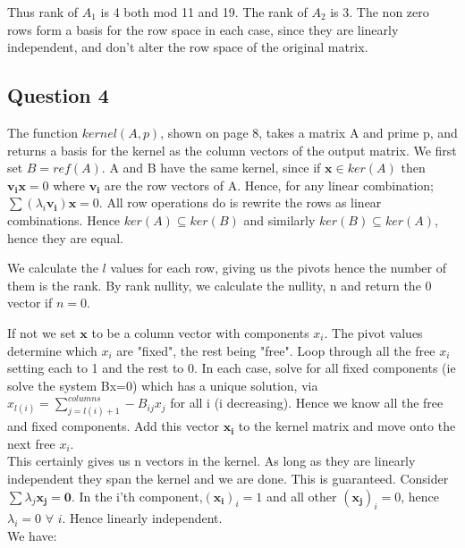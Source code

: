 \documentclass[10pt,a4paper]{report}
\begin{document}
Thus rank of $A_1$ is 4 both mod 11 and 19. The rank of $A_2$ is 3. The non zero rows form a basis for the row space in each case, since they are linearly independent, and don't alter the row space of the original matrix.

\subsection*{Question 4}
  
The function $kernel(A,p)$, shown on page 8, takes a matrix A and prime p, and returns a basis for the kernel as the column vectors of the output matrix. We first set $B=ref(A)$. A and B have the same kernel, since if $\bm{x} \in ker(A)$ then $\bm{v_i}\bm{x}=0$ where $\bm{v_i}$ are the row vectors of A. Hence, for any linear combination; $\sum( \lambda_i \bm{v_i})\bm{x}=0$. All row operations do is rewrite the rows as linear combinations. Hence $ker(A)\subseteq ker(B)$ and similarly $ker(B)\subseteq ker(A)$, hence they are equal.

We calculate the $l$ values for each row, giving us the pivots hence the number of them is the rank. By rank nullity, we calculate the nullity, n and return the 0 vector if $n=0$. 

If not we set $\bm{x}$ to be a column vector with components $x_i$. The pivot values determine which $x_i$ are "fixed", the rest being "free". Loop through all the free $x_i$ setting each to 1 and the rest to 0. In each case, solve for all fixed components (ie solve the system Bx=0) which has a unique solution, via $x_{l(i)}=\sum_{j=l(i)+1}^{columns} -B_{ij}x_j$ for all i (i decreasing). Hence we know all the free and fixed components. Add this vector $\bm{x_i}$ to the kernel matrix and move onto the next free $x_i$.\\

This certainly gives us n vectors in the kernel. As long as they are linearly independent they span the kernel and we are done. This is guaranteed. Consider
$\sum\lambda_j \bm{x_j} =\bm{0}$. In the i'th component,$(\bm{x_i})_i=1$ and all other $(\bm{x_j})_i=0$, hence $\lambda_i=0$ $\forall$ $i$. Hence linearly independent.\\


We have:

\vspace{5mm}
\end{document}
